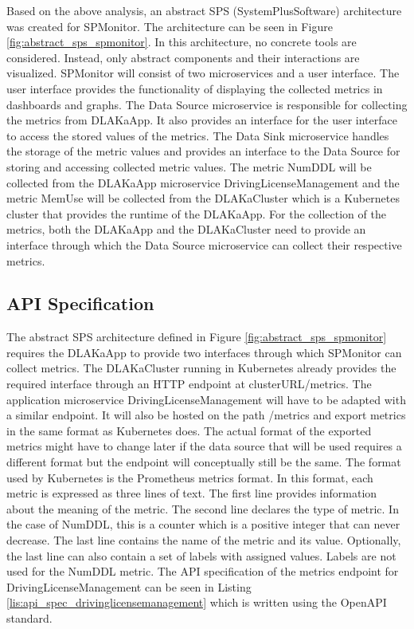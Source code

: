 Based on the above analysis, an abstract SPS (SystemPlusSoftware) architecture was created for SPMonitor.
The architecture can be seen in Figure \ref{fig:abstract_sps_spmonitor}.
In this architecture, no concrete tools are considered. Instead, only abstract components
and their interactions are visualized.
SPMonitor will consist of two microservices and a user interface.
The user interface provides the functionality of displaying the collected metrics
in dashboards and graphs. The Data Source microservice is responsible for collecting
the metrics from DLAKaApp. It also provides an interface for the user interface
to access the stored values of the metrics. The Data Sink microservice handles the storage
of the metric values and provides an interface to the Data Source for storing and accessing
collected metric values.
The metric NumDDL will be collected from the DLAKaApp microservice DrivingLicenseManagement
and the metric MemUse will be collected from the DLAKaCluster which is a Kubernetes cluster
that provides the runtime of the DLAKaApp.
For the collection of the metrics, both the DLAKaApp and the DLAKaCluster need to provide
an interface through which the Data Source microservice can collect their respective metrics.

\subsection{API Specification}


The abstract SPS architecture defined in Figure \ref{fig:abstract_sps_spmonitor} requires
the DLAKaApp to provide two interfaces through which SPMonitor can collect metrics.
The DLAKaCluster running in Kubernetes already provides the required interface 
through an HTTP endpoint at clusterURL/metrics. The application microservice DrivingLicenseManagement
will have to be adapted with a similar endpoint. It will also be hosted on the path /metrics
and export metrics in the same format as Kubernetes does. The actual format of the exported metrics
might have to change later if the data source that will be used requires a different format
but the endpoint will conceptually still be the same. The format used by Kubernetes is the Prometheus
metrics format. In this format, each metric is expressed as three lines of text. The first line
provides information about the meaning of the metric. The second line declares the type of metric.
In the case of NumDDL, this is a counter which is a positive integer that can never decrease.
The last line contains the name of the metric and its value. Optionally, the last line
can also contain a set of labels with assigned values. Labels are not used for the NumDDL metric.
The API specification of the metrics endpoint for DrivingLicenseManagement can be seen in Listing \ref{lis:api_spec_drivinglicensemanagement}
which is written using the OpenAPI standard.

